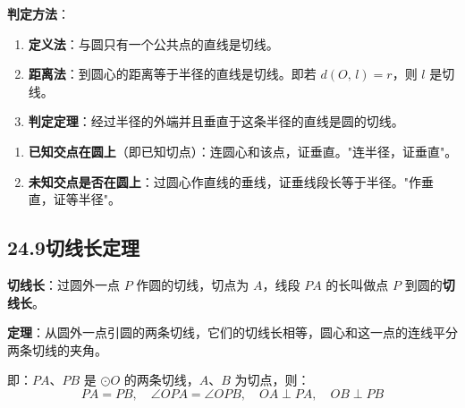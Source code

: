 \documentclass[12pt, a4paper]{ctexart}
\begin{document}
\begin{center}
\end{center}

\begin{knowledgebox}[切线的判定]
\textbf{判定方法}：

\begin{enumerate}[nosep]
  \item \textbf{定义法}：与圆只有一个公共点的直线是切线。
  \item \textbf{距离法}：到圆心的距离等于半径的直线是切线。即若 $d(O,\, l) = r$，则 $l$ 是切线。
  \item \textbf{判定定理}：经过半径的外端并且垂直于这条半径的直线是圆的切线。
\end{enumerate}
\end{knowledgebox}

\begin{tipbox}[证明切线的两种常见情况]
\begin{enumerate}[nosep]
  \item \textbf{已知交点在圆上}（即已知切点）：连圆心和该点，证垂直。"连半径，证垂直"。
  \item \textbf{未知交点是否在圆上}：过圆心作直线的垂线，证垂线段长等于半径。"作垂直，证等半径"。
\end{enumerate}
\end{tipbox}

\subsection*{24.9\quad 切线长定理}

\begin{knowledgebox}[切线长]
\textbf{切线长}：过圆外一点 $P$ 作圆的切线，切点为 $A$，线段 $PA$ 的长叫做点 $P$ 到圆的\textbf{切线长}。
\end{knowledgebox}

\begin{knowledgebox}[切线长定理]
\textbf{定理}：从圆外一点引圆的两条切线，它们的切线长相等，圆心和这一点的连线平分两条切线的夹角。

即：$PA$、$PB$ 是 $\odot O$ 的两条切线，$A$、$B$ 为切点，则：
\[
PA = PB, \quad \angle OPA = \angle OPB, \quad OA \perp PA, \quad OB \perp PB
\]
\end{knowledgebox}
\end{document}
